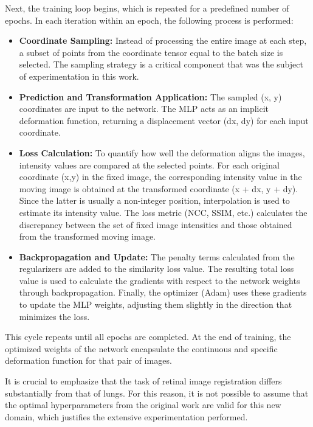 Next, the training loop begins, which is repeated for a predefined number of epochs. In each iteration within an epoch, the following process is performed:
\begin{itemize}
    \item \textbf{Coordinate Sampling:} Instead of processing the entire image at each step, a subset of points from the coordinate tensor equal to the batch size is selected. The sampling strategy is a critical component that was the subject of experimentation in this work.

    \item \textbf{Prediction and Transformation Application:} The sampled (x, y) coordinates are input to the network. The MLP acts as an implicit deformation function, returning a displacement vector (dx, dy) for each input coordinate.

    \item \textbf{Loss Calculation:} To quantify how well the deformation aligns the images, intensity values are compared at the selected points. For each original coordinate (x,y) in the fixed image, the corresponding intensity value in the moving image is obtained at the transformed coordinate (x + dx, y + dy). Since the latter is usually a non-integer position, interpolation is used to estimate its intensity value. The loss metric (NCC, SSIM, etc.) calculates the discrepancy between the set of fixed image intensities and those obtained from the transformed moving image.

    \item \textbf{Backpropagation and Update:} The penalty terms calculated from the regularizers are added to the similarity loss value. The resulting total loss value is used to calculate the gradients with respect to the network weights through backpropagation. Finally, the optimizer (Adam) uses these gradients to update the MLP weights, adjusting them slightly in the direction that minimizes the loss.
\end{itemize}

This cycle repeats until all epochs are completed. At the end of training, the optimized weights of the network encapsulate the continuous and specific deformation function for that pair of images.

It is crucial to emphasize that the task of retinal image registration differs substantially from that of lungs. For this reason, it is not possible to assume that the optimal hyperparameters from the original work are valid for this new domain, which justifies the extensive experimentation performed.

